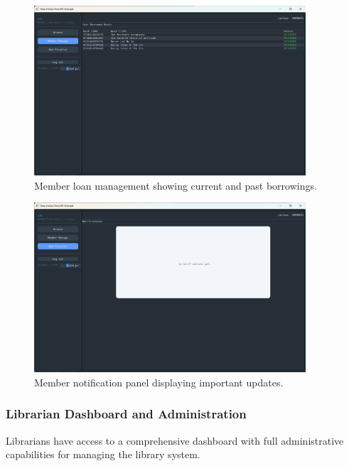 \begin{figure}[H]
	\centering
	\includegraphics[width=0.9\textwidth]{figures/screenshot_member_myloanmanage.png}
	\caption{Member loan management showing current and past borrowings.}
	\label{fig:ss_member_loans}
\end{figure}

\begin{figure}[H]
	\centering
	\includegraphics[width=0.9\textwidth]{figures/screenshot_member_noti.png}
	\caption{Member notification panel displaying important updates.}
	\label{fig:ss_member_noti}
\end{figure}

\subsubsection{Librarian Dashboard and Administration}
Librarians have access to a comprehensive dashboard with full administrative capabilities for managing the library system.

